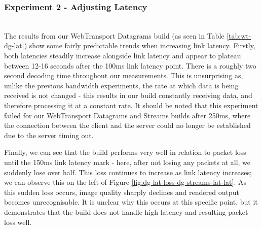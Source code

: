 \subsubsection{Experiment 2 - Adjusting Latency} 
\hfill{} \\
The results from our WebTransport Datagrams build (as seen in Table \ref{tab:wt-dg-lat}) show some fairly predictable trends when increasing link latency. 
Firstly, both latencies steadily increase alongside link latency and appear to plateau between 12-16 seconds after the 100ms link latency point. There is a roughly two second decoding time throughout our measurements. This is unsurprising as, unlike the previous bandwidth experiments, the rate at which data is being received is not changed - this results in our build constantly receiving data, and therefore processing it at a constant rate. It should be noted that this experiment failed for our WebTransport Datagrams and Streams builds after 250ms, where the connection between the client and the server could no longer be established due to the server timing out. 

Finally, we can see that the build performs very well in relation to packet loss until the 150ms link latency mark - here, after not losing any packets at all, we suddenly lose over half. This loss continues to increase as link latency increases; we can observe this on the left of Figure \ref{fig:dg-lat-loss-dg-streams-lat-lat}. As this sudden loss occurs, image quality sharply declines and rendered output becomes unrecognisable. It is unclear why this occurs at this specific point, but it demonstrates that the build does not handle high latency and resulting packet loss well. 

